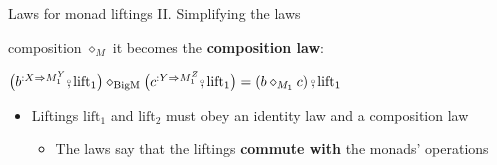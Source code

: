 \documentclass[english]{beamer}
\newcommand{\bef}{\ensuremath\raisebox{2pt}{$\mathsmaller{\mathsmaller{\circ}}$}\hspace{-3.3pt},}
\begin{document}
\begin{frame}{Laws for monad liftings II. Simplifying the laws}
\begin{itemize}
composition $\diamond_{M}$ it becomes the \textbf{composition law}:
\end{itemize}
\begin{center}
{\footnotesize{}\vspace{-0.2cm}\hspace{-0.0cm}$\big(b^{:X\Rightarrow M_{1}^{Y}}\bef\text{lift}_{1}\big)\diamond_{\text{BigM}}\big(c^{:Y\Rightarrow M_{1}^{Z}}\bef\text{lift}_{1}\big)=\left(b\diamond_{M_{1}}c\right)\bef\text{lift}_{1}$}{\footnotesize\par}
\par\end{center}
\begin{itemize}
\item {\footnotesize{}\vspace{-0.3cm}\hspace{-0.0cm}}Liftings $\text{lift}_{1}$
and $\text{lift}_{2}$ must obey an identity law and a composition
law
\begin{itemize}
\item The laws say that the liftings \textbf{commute with} the monads' operations
\end{itemize}
\end{itemize}
\end{frame}
\end{document}
